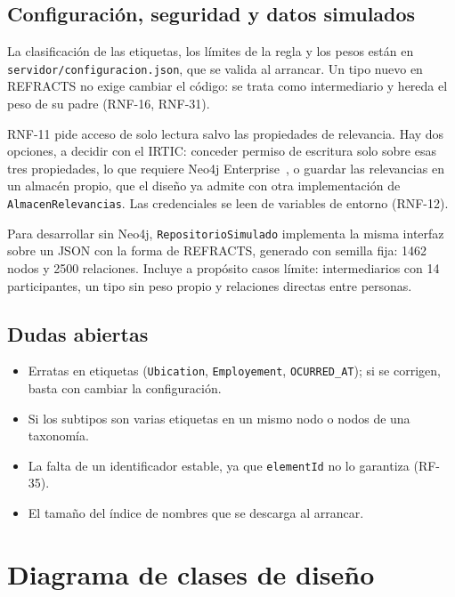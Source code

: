 
\subsection{Configuración, seguridad y datos simulados}

La clasificación de las etiquetas, los límites de la regla y los pesos están en \texttt{servidor/configuracion.json}, que se valida al arrancar. Un tipo nuevo en REFRACTS no exige cambiar el código: se trata como intermediario y hereda el peso de su padre (RNF-16, RNF-31).

RNF-11 pide acceso de solo lectura salvo las propiedades de relevancia. Hay dos opciones, a decidir con el IRTIC: conceder permiso de escritura solo sobre esas tres propiedades, lo que requiere Neo4j Enterprise~\cite{neo4jprivilegios}, o guardar las relevancias en un almacén propio, que el diseño ya admite con otra implementación de \texttt{AlmacenRelevancias}. Las credenciales se leen de variables de entorno (RNF-12). 

Para desarrollar sin Neo4j, \texttt{RepositorioSimulado} implementa la misma interfaz sobre un JSON con la forma de REFRACTS, generado con semilla fija: 1462 nodos y 2500 relaciones. Incluye a propósito casos límite: intermediarios con 14 participantes, un tipo sin peso propio y relaciones directas entre personas.

\subsection{Dudas abiertas}
\label{sec:bd-dudas}

\begin{itemize}
  \item Erratas en etiquetas (\texttt{Ubication}, \texttt{Employement}, \texttt{OCURRED\_AT}); si se corrigen, basta con cambiar la configuración.
  \item Si los subtipos son varias etiquetas en un mismo nodo o nodos de una taxonomía.
  \item La falta de un identificador estable, ya que \texttt{elementId} no lo garantiza (RF-35).
  \item El tamaño del índice de nombres que se descarga al arrancar.
\end{itemize}

\section{Diagrama de clases de diseño}
\label{sec:clases}

